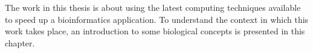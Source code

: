 The work in this thesis is about using the latest computing techniques available to speed up a bioinformatics application. To understand the context in which this work takes place, an introduction to some biological concepts is presented in this chapter.